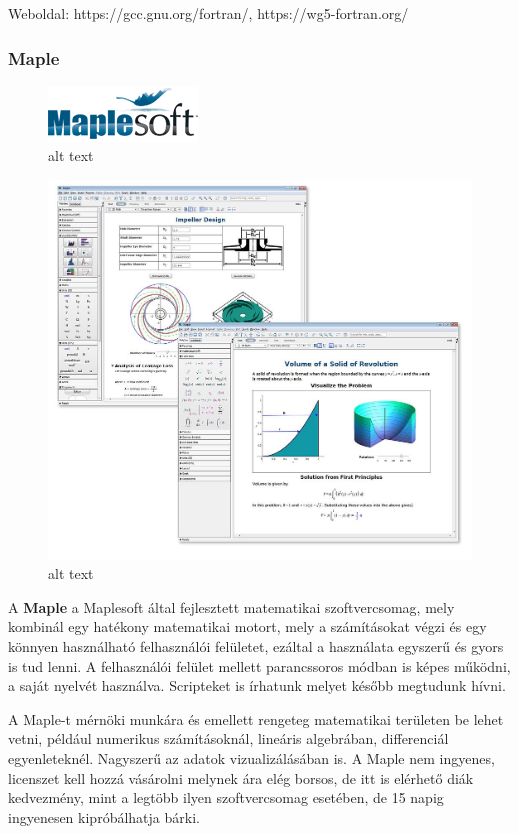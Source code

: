 Weboldal: https://gcc.gnu.org/fortran/, https://wg5-fortran.org/

    \subsubsection{Maple}\label{maple}

    \begin{figure}
\centering
\includegraphics{img/maple_logo.png}
\caption{alt text}
\end{figure}

\begin{figure}
\centering
\includegraphics{img/Maple_screenshots.jpg}
\caption{alt text}
\end{figure}

A \textbf{Maple} a Maplesoft által fejlesztett matematikai
szoftvercsomag, mely kombinál egy hatékony matematikai motort, mely a
számításokat végzi és egy könnyen használható felhasználói felületet,
ezáltal a használata egyszerű és gyors is tud lenni. A felhasználói
felület mellett parancssoros módban is képes működni, a saját nyelvét
használva. Scripteket is írhatunk melyet később megtudunk hívni.

A Maple-t mérnöki munkára és emellett rengeteg matematikai területen be
lehet vetni, például numerikus számításoknál, lineáris algebrában,
differenciál egyenleteknél. Nagyszerű az adatok vizualizálásában is. A
Maple nem ingyenes, licenszet kell hozzá vásárolni melynek ára elég
borsos, de itt is elérhető diák kedvezmény, mint a legtöbb ilyen
szoftvercsomag esetében, de 15 napig ingyenesen kipróbálhatja bárki.

